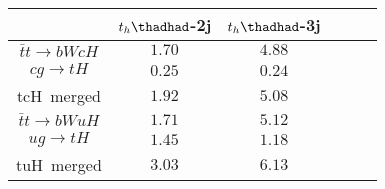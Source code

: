 
\centering
\begin{tabular}{|c|c|c|c|c|c|} \hline
& $t_{h}\thadhad$-2j & $t_{h}\thadhad$-3j\\\hline
$\bar{t}t\to bWcH$ & $1.70$ & $4.88$ \\\hline
$cg\to tH$ &  $0.25$        & $0.24$ \\\hline
tcH~merged &  $1.92$        & $5.08$  \\\hline
$\bar{t}t\to bWuH$ & $1.71$ & $5.12$   \\\hline
$ug\to tH$ & $1.45$         & $1.18$   \\\hline
tuH~merged & $3.03$         & $6.13$   \\\hline
\end{tabular}
